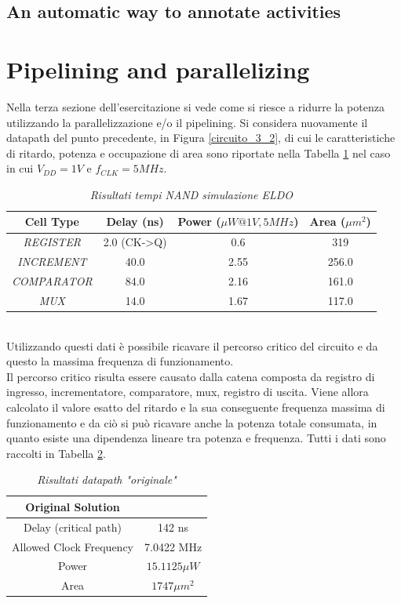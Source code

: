 \subsection{An automatic way to annotate activities}

\section{Pipelining and parallelizing}
Nella terza sezione dell'esercitazione si vede come si riesce a ridurre la potenza utilizzando la parallelizzazione e/o il pipelining. Si considera nuovamente il datapath del punto precedente, in Figura \ref{circuito_3_2}, di cui le caratteristiche di ritardo, potenza e occupazione di area sono riportate nella Tabella \ref{Tab33_1} nel caso in cui $V_{DD}=1 V$ e $f_{CLK}=5 MHz$.
\begin{table}[!h]\footnotesize
	\centering
	\begin{tabular}{|c|c|c|c|}
		\hline
		\textbf{Cell Type}& \textbf{Delay (ns)} & \textbf{Power ($\mu W @1 V, 5 MHz$)} & \textbf{Area ($\mu m^{2}$)} \\
		\hline
		\textit{REGISTER}& 2.0 (CK->Q) & 0.6 & 319 \\
	\textit{INCREMENT}& 40.0 & 2.55 & 256.0 \\
		\textit{COMPARATOR} & 84.0 & 2.16 & 161.0\\
		\textit{MUX} & 14.0 & 1.67& 117.0\\
		\hline
	\end{tabular}
	\caption{\textit{Risultati tempi NAND simulazione ELDO}}
	\label{Tab33_1}
\end{table}
\\
Utilizzando questi dati è possibile ricavare il percorso critico del circuito e da questo la massima frequenza di funzionamento.\\
Il percorso critico risulta essere causato dalla catena composta da registro di ingresso, incrementatore, comparatore, mux, registro di uscita. Viene allora calcolato il valore esatto del ritardo e la sua conseguente frequenza massima di funzionamento e da ciò si può ricavare anche la potenza totale consumata, in quanto esiste una dipendenza lineare tra potenza e frequenza. Tutti i dati sono raccolti in Tabella \ref{Tab33_2}.
\begin{table}[!h]\footnotesize
	\centering
	\begin{tabular}{|c|c|}
		\hline
		\textbf{Original Solution} & \\
		\hline
		Delay (critical path) & 142 ns\\
		Allowed Clock Frequency & 7.0422 MHz\\
		Power & $15.1125 \mu W$\\
		Area & $1747 \mu m^{2}$\\
		\hline
	\end{tabular}
	\caption{\textit{Risultati datapath "originale"}}
	\label{Tab33_2}
\end{table}
